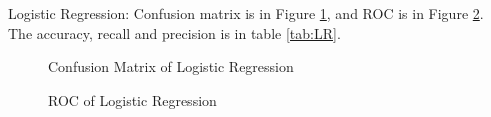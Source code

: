 \documentclass{article}
\begin{document}
Logistic Regression: Confusion matrix is in Figure \ref{fig:CMLR}, and ROC is in Figure \ref{fig:ROCLR}. The accuracy, recall and precision is in table \ref{tab:LR}.


\begin{figure}
\centering
{}
\caption{Confusion Matrix of Logistic Regression} \label{fig:CMLR}
\end{figure}


\begin{figure}
\centering
{}
\caption{ROC of Logistic Regression} \label{fig:ROCLR}
\end{figure}


\begin{table}[h]
\center
\caption{Estimation result for Logistic Regression}
\label{tab:LR}
\end{table}
\end{document}
